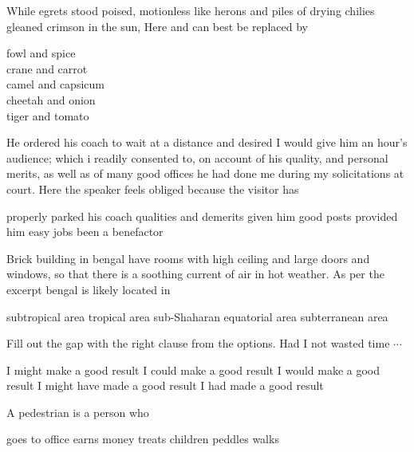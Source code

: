 \documentclass[addpoints]{exam}
\begin{document}
\begin{questions}
\question  While egrets stood poised, motionless like herons and piles of drying chilies gleaned crimson in the sun, Here  and  can best be replaced by 

\begin{oneparchoices}
\hspace*{.2cm} \choice fowl and spice\\
\choice crane and carrot\\
\choice camel and capsicum\\
\choice cheetah and onion\\
\choice tiger and tomato
\end{oneparchoices}



\question  He ordered his coach to wait at a distance and desired I would give him an hour's audience; which i readily consented to, on account of his quality, and personal merits, as well as of many good offices he had done me during my solicitations at court. Here the speaker feels obliged because the visitor has 

\begin{oneparchoices}
\choice properly parked his coach
\choice qualities and demerits
\choice given him good posts
\choice provided him easy jobs
\choice been a benefactor
\end{oneparchoices}


\question  Brick building in bengal have rooms with high ceiling and large doors and windows, so that there is a soothing current of air in hot weather. As per the excerpt bengal is likely located  in

\begin{oneparchoices}
\choice  subtropical area
\choice  tropical area
\choice  sub-Shaharan  
\choice  equatorial area
\choice subterranean area 
\end{oneparchoices}

\question  Fill out the gap with the right clause from the options. Had I not wasted time $ \cdots $

\begin{oneparchoices}
\choice I might make a good result
\choice I could make a good result
\choice I would make a good result
\choice I might have made a good result
\choice I had made a good result
\end{oneparchoices}

\question  A pedestrian is a person who  

\begin{oneparchoices}
\choice goes to office 
\choice earns money
\choice treats children 
\choice peddles
\choice walks
\end{oneparchoices}


\end{questions}
\end{document}
